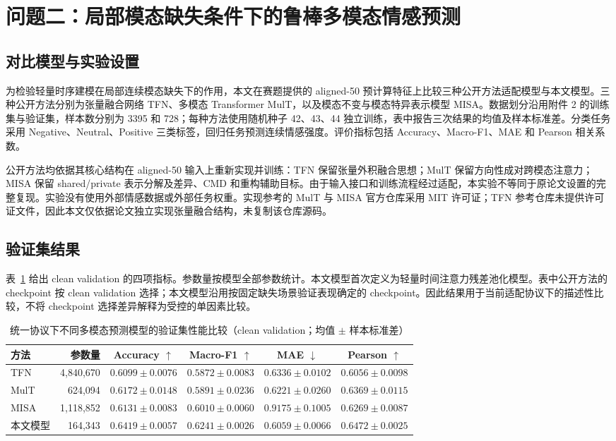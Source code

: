 \section{问题二：局部模态缺失条件下的鲁棒多模态情感预测}

\subsection{对比模型与实验设置}
为检验轻量时序建模在局部连续模态缺失下的作用，本文在赛题提供的 aligned-50 预计算特征上比较三种公开方法适配模型与本文模型。三种公开方法分别为张量融合网络 TFN\cite{zadeh-etal-2017-tensor}、多模态 Transformer MulT\cite{tsai-etal-2019-multimodal}，以及模态不变与模态特异表示模型 MISA\cite{hazarika-etal-2020-misa}。数据划分沿用附件 2 的训练集与验证集，样本数分别为 3395 和 728；每种方法使用随机种子 42、43、44 独立训练，表中报告三次结果的均值及样本标准差。分类任务采用 Negative、Neutral、Positive 三类标签，回归任务预测连续情感强度。评价指标包括 Accuracy、Macro-F1、MAE 和 Pearson 相关系数。

公开方法均依据其核心结构在 aligned-50 输入上重新实现并训练：TFN 保留张量外积融合思想；MulT 保留方向性成对跨模态注意力；MISA 保留 shared/private 表示分解及差异、CMD 和重构辅助目标。由于输入接口和训练流程经过适配，本实验不等同于原论文设置的完整复现。实验没有使用外部情感数据或外部任务权重。实现参考的 MulT 与 MISA 官方仓库采用 MIT 许可证；TFN 参考仓库未提供许可证文件，因此本文仅依据论文独立实现张量融合结构，未复制该仓库源码。

\clearpage
\subsection{验证集结果}
表~\ref{tab:q2-clean-model-comparison} 给出 clean validation 的四项指标。参数量按模型全部参数统计。本文模型首次定义为轻量时间注意力残差池化模型。表中公开方法的 checkpoint 按 clean validation 选择；本文模型沿用按固定缺失场景验证表现确定的 checkpoint。因此结果用于当前适配协议下的描述性比较，不将 checkpoint 选择差异解释为受控的单因素比较。

\begin{table}[htbp]
\centering
\small
\setlength{\tabcolsep}{4pt}
\caption{统一协议下不同多模态预测模型的验证集性能比较（clean validation；均值 $\pm$ 样本标准差）}
\label{tab:q2-clean-model-comparison}
\begin{tabular}{l r c c c c}
\toprule
方法 & 参数量 & Accuracy $\uparrow$ & Macro-F1 $\uparrow$ & MAE $\downarrow$ & Pearson $\uparrow$ \\
\midrule
TFN & 4,840,670 & $0.6099\pm0.0076$ & $0.5872\pm0.0083$ & $0.6336\pm0.0102$ & $0.6056\pm0.0098$ \\
MulT & 624,094 & $0.6172\pm0.0148$ & $0.5891\pm0.0236$ & $0.6221\pm0.0260$ & $0.6369\pm0.0115$ \\
MISA & 1,118,852 & $0.6131\pm0.0083$ & $0.6010\pm0.0060$ & $0.9175\pm0.1005$ & $0.6269\pm0.0087$ \\
本文模型 & 164,343 & $0.6419\pm0.0057$ & $0.6241\pm0.0026$ & $0.6059\pm0.0066$ & $0.6472\pm0.0025$ \\
\bottomrule
\end{tabular}
\end{table}

